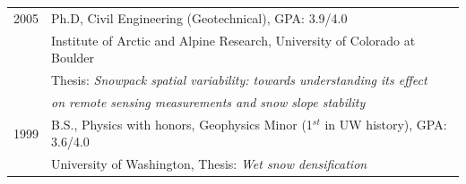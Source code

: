 \documentclass[11pt]{article}
\begin{document}
\begin{tabular}{ll}
	2005 & Ph.D, Civil Engineering (Geotechnical), GPA: 3.9/4.0 \\
	          & Institute of Arctic and Alpine Research, University of Colorado at Boulder \\
		 & Thesis: \textit{Snowpack spatial variability: towards understanding its effect} \\
		&  \textit{on remote sensing measurements and snow slope stability} \\
	1999 &  B.S., Physics with honors, Geophysics Minor (1$^{st}$ in UW history), GPA: 3.6/4.0 \\
	         &   University of Washington, Thesis: \textit{Wet snow densification} \\
\end{tabular}
\end{document}
